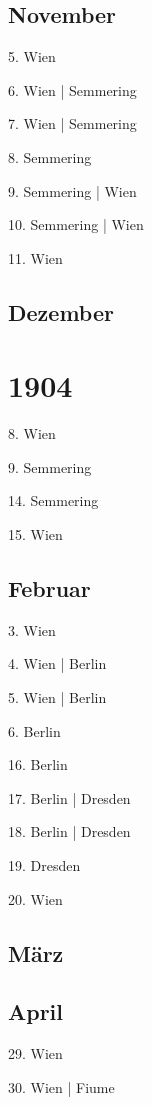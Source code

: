 \documentclass[twoside=false,titlepage=false,open=any, parskip=never, fontsize=10pt, headings=small, chapterprefix=false, appendixprefix=false, DIV=15]{scrbook}
\begin{document}
\begin{multicols}{3}
            \section*{November}
            5. Wien\par
            6. Wien | Semmering\par
            7. Wien | Semmering\par
            8. Semmering\par
            9. Semmering | Wien\par
            10. Semmering | Wien\par
            11. Wien\par
            \section*{Dezember}
            \chapter*{1904}
            8. Wien\par
            9. Semmering\par
            14. Semmering\par
            15. Wien\par
            \section*{Februar}
            3. Wien\par
            4. Wien | Berlin\par
            5. Wien | Berlin\par
            6. Berlin\par
            16. Berlin\par
            17. Berlin | Dresden\par
            18. Berlin | Dresden\par
            19. Dresden\par
            20. Wien\par
            \section*{März}
            \section*{April}
            29. Wien\par
            30. Wien | Fiume\par

\end{multicols}
\end{document}
